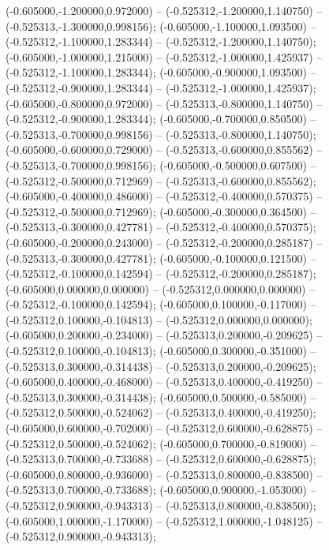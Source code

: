 (-0.605000,-1.200000,0.972000) -- (-0.525312,-1.200000,1.140750) -- (-0.525313,-1.300000,0.998156);
 (-0.605000,-1.100000,1.093500) -- (-0.525312,-1.100000,1.283344) -- (-0.525312,-1.200000,1.140750);
 (-0.605000,-1.000000,1.215000) -- (-0.525312,-1.000000,1.425937) -- (-0.525312,-1.100000,1.283344);
 (-0.605000,-0.900000,1.093500) -- (-0.525312,-0.900000,1.283344) -- (-0.525312,-1.000000,1.425937);
 (-0.605000,-0.800000,0.972000) -- (-0.525313,-0.800000,1.140750) -- (-0.525312,-0.900000,1.283344);
 (-0.605000,-0.700000,0.850500) -- (-0.525313,-0.700000,0.998156) -- (-0.525313,-0.800000,1.140750);
 (-0.605000,-0.600000,0.729000) -- (-0.525313,-0.600000,0.855562) -- (-0.525313,-0.700000,0.998156);
 (-0.605000,-0.500000,0.607500) -- (-0.525312,-0.500000,0.712969) -- (-0.525313,-0.600000,0.855562);
 (-0.605000,-0.400000,0.486000) -- (-0.525312,-0.400000,0.570375) -- (-0.525312,-0.500000,0.712969);
 (-0.605000,-0.300000,0.364500) -- (-0.525313,-0.300000,0.427781) -- (-0.525312,-0.400000,0.570375);
 (-0.605000,-0.200000,0.243000) -- (-0.525312,-0.200000,0.285187) -- (-0.525313,-0.300000,0.427781);
 (-0.605000,-0.100000,0.121500) -- (-0.525312,-0.100000,0.142594) -- (-0.525312,-0.200000,0.285187);
 (-0.605000,0.000000,0.000000) -- (-0.525312,0.000000,0.000000) -- (-0.525312,-0.100000,0.142594);
 (-0.605000,0.100000,-0.117000) -- (-0.525312,0.100000,-0.104813) -- (-0.525312,0.000000,0.000000);
 (-0.605000,0.200000,-0.234000) -- (-0.525313,0.200000,-0.209625) -- (-0.525312,0.100000,-0.104813);
 (-0.605000,0.300000,-0.351000) -- (-0.525313,0.300000,-0.314438) -- (-0.525313,0.200000,-0.209625);
 (-0.605000,0.400000,-0.468000) -- (-0.525313,0.400000,-0.419250) -- (-0.525313,0.300000,-0.314438);
 (-0.605000,0.500000,-0.585000) -- (-0.525312,0.500000,-0.524062) -- (-0.525313,0.400000,-0.419250);
 (-0.605000,0.600000,-0.702000) -- (-0.525312,0.600000,-0.628875) -- (-0.525312,0.500000,-0.524062);
 (-0.605000,0.700000,-0.819000) -- (-0.525313,0.700000,-0.733688) -- (-0.525312,0.600000,-0.628875);
 (-0.605000,0.800000,-0.936000) -- (-0.525313,0.800000,-0.838500) -- (-0.525313,0.700000,-0.733688);
 (-0.605000,0.900000,-1.053000) -- (-0.525312,0.900000,-0.943313) -- (-0.525313,0.800000,-0.838500);
 (-0.605000,1.000000,-1.170000) -- (-0.525312,1.000000,-1.048125) -- (-0.525312,0.900000,-0.943313);
